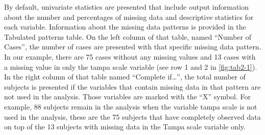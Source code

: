 \documentclass[]{book}
\begin{document}
By default, univariate statistics are presented that include output
information about the number and percentages of missing data and
descriptive statistics for each variable. Information about the missing
data patterns is provided in the Tabulated patterns table. On the left
column of that table, named ``Number of Cases'', the number of cases are
presented with that specific missing data pattern. In our example, there
are 75 cases without any missing values and 13 cases with a missing
value in only the tampa scale variable (see row 1 and 2 in
\ref{fig:tab2-1}). In the right column of that table named ``Complete
if\ldots{}'', the total number of subjects is presented if the variables
that contain missing data in that pattern are not used in the analysis.
Those variables are marked with the ``X'' symbol. For example, 88
subjects remain in the analysis when the variable tampa scale is not
used in the analysis, these are the 75 subjects that have completely
observed data on top of the 13 subjects with missing data in the Tampa
scale variable only.
\end{document}
